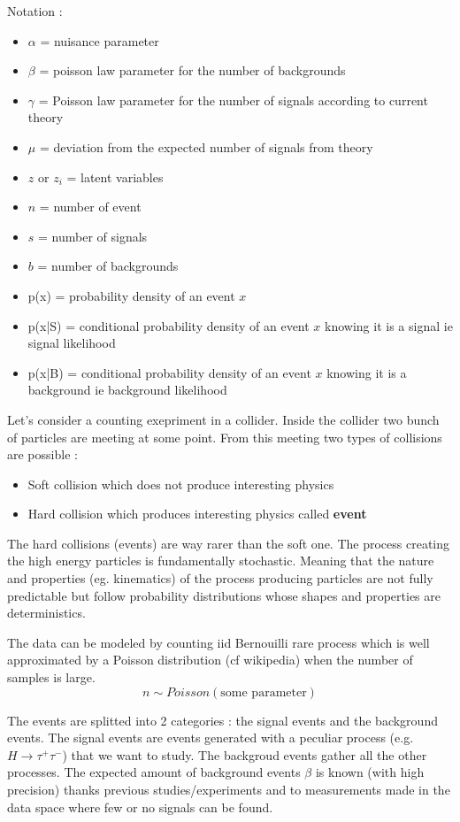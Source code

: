 Notation :
\begin{itemize}
	\item $\alpha$ = nuisance parameter
	\item $\beta$ = poisson law parameter for the number of backgrounds
	\item $\gamma$ = Poisson law parameter for the number of signals according to current theory
	\item $\mu$ = deviation from the expected number of signals from theory
	\item $z$ or $z_i$ = latent variables 
	\item $n$ = number of event
	\item $s$ = number of signals
	\item $b$ = number of backgrounds
	\item p(x) = probability density of an event $x$
	\item p(x|S) = conditional probability density of an event $x$ knowing it is a signal ie signal likelihood
	\item p(x|B) = conditional probability density of an event $x$ knowing it is a background ie background likelihood
\end{itemize}

Let's consider a counting exepriment in a collider.
Inside the collider two bunch of particles are meeting at some point.
From this meeting two types of collisions are possible :
\begin{itemize}
	\item Soft collision which does not produce interesting physics
	\item Hard collision which produces interesting physics called \textbf{event}
\end{itemize}

The hard collisions (events) are way rarer than the soft one.
The process creating the high energy particles is fundamentally stochastic.
Meaning that the nature and properties (eg. kinematics) of the process producing particles are not fully predictable but follow probability distributions whose shapes and properties are deterministics.

The data can be modeled by counting iid Bernouilli rare process which is well approximated by a Poisson distribution \needcite (cf wikipedia) when the number of samples is large.
\begin{equation}
	n \sim Poisson(\text{some parameter})
\end{equation}


The events are splitted into 2 categories : the signal events and the background events.
The signal events are events generated with a peculiar process (e.g. $H\to \tau^+ \tau^-$) that we want to study.
The backgroud events gather all the other processes.
The expected amount of background events $\beta$ is known (with high precision) thanks previous studies/experiments and to measurements made in the data space where few or no signals can be found.



